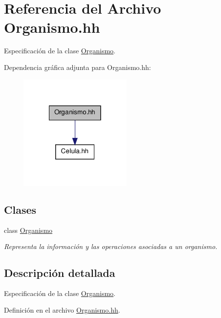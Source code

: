 \hypertarget{_organismo_8hh}{\section{\-Referencia del \-Archivo \-Organismo.\-hh}
\label{_organismo_8hh}
}


\-Especificación de la clase \hyperlink{class_organismo}{\-Organismo}.  


\-Dependencia gráfica adjunta para \-Organismo.\-hh\-:
\nopagebreak
\begin{figure}[H]
\begin{center}
\leavevmode
\includegraphics[width=158pt]{_organismo_8hh__incl}
\end{center}
\end{figure}
\subsection*{\-Clases}
\begin{DoxyCompactItemize}
\item 
class \hyperlink{class_organismo}{\-Organismo}
\begin{DoxyCompactList}\small\item\em \-Representa la información y las operaciones asociadas a un organismo. \end{DoxyCompactList}\end{DoxyCompactItemize}


\subsection{\-Descripción detallada}
\-Especificación de la clase \hyperlink{class_organismo}{\-Organismo}. 

\-Definición en el archivo \hyperlink{_organismo_8hh_source}{\-Organismo.\-hh}.

